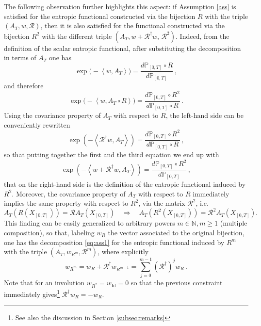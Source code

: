 \documentclass[a4paper,11pt]{article}
\numberwithin{equation}{section}
\begin{document}
The following observation further highlights this aspect: if Assumption \ref{ass} is satisfied for the entropic functional constructed via the bijection $R$ with the triple $(A_T,w,\mathcal{R})$, then it is also satisfied for the functional constructed via the bijection $R^2$ with the different triple $(A_T,w +\mathcal{R}^\dag w,\,\mathcal{R}^2)$. Indeed, from the definition of the scalar entropic functional, after substituting the decomposition in terms of $A_T$ one has
\begin{equation*}
     \exp\big(-\left\langle w, A_T\right\rangle\big)  =\frac{d\mathbb{P}_{\left[0,T\right]} \circ R }{d\mathbb{P}_{\left[0,T\right]}} \,,
\end{equation*}
and therefore
\begin{equation*}
     \exp\big(-\left\langle w, A_T \circ R\right\rangle\big)  =\frac{d\mathbb{P}_{\left[0,T\right]} \circ R^2 }{d\mathbb{P}_{\left[0,T\right]}\circ R}  \,.
\end{equation*}
Using the covariance property of $A_T$ with respect to $R$, the left-hand side can be conveniently rewritten
\begin{equation*}
     \exp\left(-\left\langle \mathcal{R}^\dag w, A_T \right\rangle\right)  =\frac{d\mathbb{P}_{\left[0,T\right]} \circ R^2 }{d\mathbb{P}_{\left[0,T\right]}\circ R}  \,,
\end{equation*}
so that putting together the first and the third equation we end up with
\begin{equation}
     \exp\left(-\left\langle w + \mathcal{R}^\dag w, A_T \right\rangle\right)  =\frac{d\mathbb{P}_{\left[0,T\right]} \circ R^2 }{d\mathbb{P}_{\left[0,T\right]}}  \,,
\end{equation}
that on the right-hand side is the definition of the entropic functional induced by $R^2$.
Moreover, the covariance property of $A_T$ with respect to $R$ immediately implies the same property with respect to $R^2$, via the matrix $\mathcal{R}^2$, i.e.
\begin{equation*}   A_T\left(R\left(X_{\left[0,T\right]}\right)\right)=\mathcal{R}A_T\left(X_{\left[0,T\right]}\right) \quad  \Rightarrow  \quad A_T\left(R^2\left(X_{\left[0,T\right]}\right)\right)=\mathcal{R}^2A_T\left(X_{\left[0,T\right]}\right) .
\end{equation*}
This finding can be easily generalized to arbitrary powers $m \in \mathbb{N}, m \geq 1$ (multiple composition), so that, labeling $w_R$ the vector associated to the original bijection, one has the decomposition \eqref{eq:ass1} for the entropic functional induced by $R^m$ with the triple $(A_T,w_{R^m},\mathcal{R}^m)$, where explicitly
\begin{equation}
    w_{R^m}= w_R + \mathcal{R}^\dag w_{R^{m-1}} = \sum_{j=0}^{m-1}(\mathcal{R}^\dag)^j w_R \,.
\end{equation}
Note that for an involution $w_{R^2}=w_{\mathrm{Id}}=0$ so that the previous constraint immediately gives\footnote{See also the discussion in Section \ref{subsec:remarks}} $\mathcal{R}^\dag w_R = - w_R$.
\end{document}
